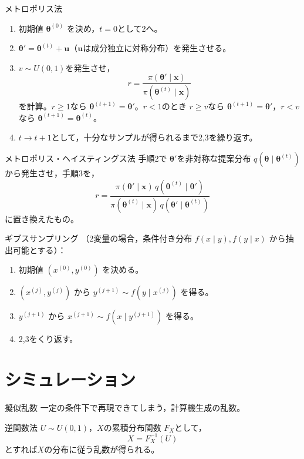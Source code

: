 \documentclass[a4paper,11pt]{ltjsarticle}
\begin{document}
\begin{term}{メトロポリス法}
\begin{enumerate}[label=\arabic*.]
\item 初期値 $\bm\theta^{(0)}$ を決め，$t=0$として2へ。
\item $\bm\theta' = \bm\theta^{(t)}+\bm u$（$\bm u$は成分独立に対称分布）を発生させる。
\item $v\sim U(0,1)$を発生させ，
\[
r = \frac{\pi(\bm\theta'\mid\bm x)}{\pi(\bm\theta^{(t)}\mid\bm x)}
\]
を計算。$r\ge1$なら $\bm\theta^{(t+1)}=\bm\theta'$。$r<1$のとき $r\ge v$なら $\bm\theta^{(t+1)}=\bm\theta'$，$r<v$なら $\bm\theta^{(t+1)}=\bm\theta^{(t)}$。
\item $t\to t+1$として，十分なサンプルが得られるまで2,3を繰り返す。
\end{enumerate}
\end{term}

\begin{term}{メトロポリス・ヘイスティングス法}
手順2で $\bm\theta'$を非対称な提案分布 $q(\bm\theta\mid\bm\theta^{(t)})$ から発生させ，手順3を，
\[
r = \frac{\pi(\bm\theta'\mid\bm x)\,q(\bm\theta^{(t)}\mid\bm\theta')}{\pi(\bm\theta^{(t)}\mid\bm x)\,q(\bm\theta'\mid\bm\theta^{(t)})}
\]
に置き換えたもの。
\end{term}

\begin{term}{ギブスサンプリング}
（2変量の場合，条件付き分布 $f(x\mid y),f(y\mid x)$ から抽出可能とする）：
\begin{enumerate}[label=\arabic*.]
\item 初期値 $(x^{(0)},y^{(0)})$ を決める。
\item $(x^{(j)},y^{(j)})$ から $y^{(j+1)} \sim f(y\mid x^{(j)})$ を得る。
\item $y^{(j+1)}$ から $x^{(j+1)}\sim f(x\mid y^{(j+1)})$ を得る。
\item 2,3をくり返す。
\end{enumerate}
\end{term}

\section{シミュレーション}

\begin{term}{擬似乱数}
一定の条件下で再現できてしまう，計算機生成の乱数。
\end{term}

\begin{term}{逆関数法}
$U\sim U(0,1)$，$X$の累積分布関数 $F_X$として，
\[
X = F_X^{-1}(U)
\]
とすれば$X$の分布に従う乱数が得られる。
\end{term}
\end{document}
